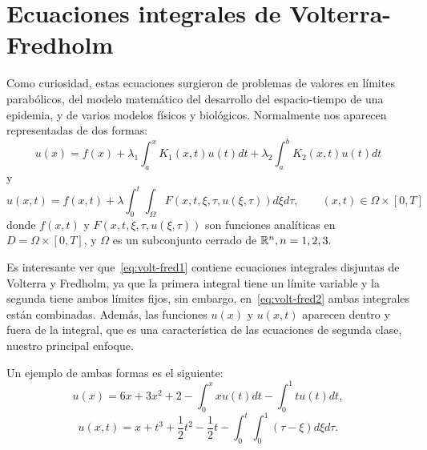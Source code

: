 \section{Ecuaciones integrales de Volterra-Fredholm}
Como curiosidad, estas ecuaciones surgieron de problemas de valores en límites parabólicos, del modelo matemático del desarrollo del espacio-tiempo de una epidemia, y de varios modelos físicos y biológicos. Normalmente nos aparecen representadas de dos formas:
\begin{equation}\label{eq:volt-fred1}
	u(x) = f(x) + \lambda_1 \int_a^x K_1(x,t)u(t)dt + \lambda_2 \int_a^b K_2(x,t)u(t)dt
\end{equation}
y
\begin{equation}\label{eq:volt-fred2}
	u(x,t) = f(x,t) + \lambda \int_0^t \int_\Omega F(x,t,\xi, \tau, u(\xi, \tau))d\xi d\tau, \qquad (x,t) \in \Omega \times [0,T]
\end{equation}
donde $f(x,t)$ y $F(x,t,\xi, \tau, u(\xi, \tau))$ son funciones analíticas en $D = \Omega \times [0,T]$, y $\Omega$ es un subconjunto cerrado de $\mathbb{R}^n, n = 1,2,3.$

Es interesante ver que~\eqref{eq:volt-fred1} contiene ecuaciones integrales disjuntas de Volterra y Fredholm, ya que la primera integral tiene un límite variable y la segunda tiene ambos límites fijos, sin embargo, en~\eqref{eq:volt-fred2} ambas integrales están combinadas. Además, las funciones $u(x)$ y $u(x,t)$ aparecen dentro y fuera de la integral, que es una característica de las ecuaciones de segunda clase, nuestro principal enfoque.
\begin{ejemplo}
	Un ejemplo de ambas formas es el siguiente:
	\begin{equation}\label{}
		u(x) = 6x + 3x^2 + 2 - \int_0^x xu(t)dt - \int_0^1 tu(t)dt,
	\end{equation}
	\begin{equation}\label{}
		u(x,t) = x + t^3 + \dfrac{1}{2}t^2 - \dfrac{1}{2}t - \int_0^t \int_0^1 (\tau - \xi)d\xi d\tau.
	\end{equation}
\end{ejemplo}
